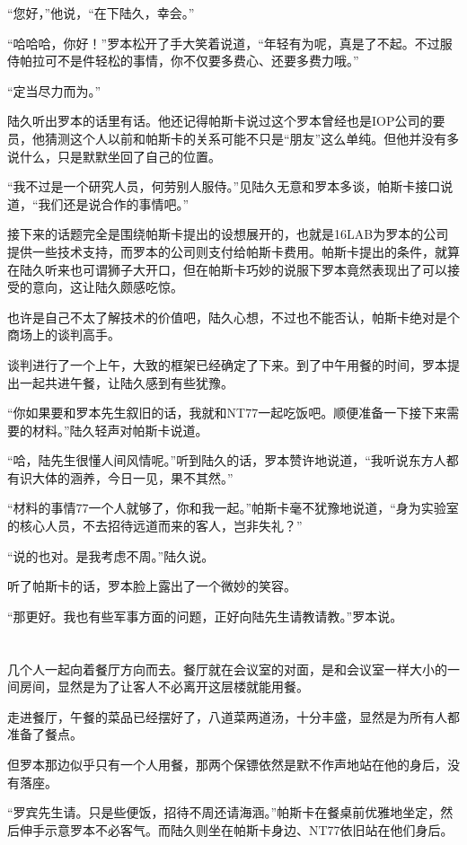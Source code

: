 “您好，”他说，“在下陆久，幸会。”

“哈哈哈，你好！”罗本松开了手大笑着说道，“年轻有为呢，真是了不起。不过服侍帕拉可不是件轻松的事情，你不仅要多费心、还要多费力哦。”

“定当尽力而为。”

陆久听出罗本的话里有话。他还记得帕斯卡说过这个罗本曾经也是IOP公司的要员，他猜测这个人以前和帕斯卡的关系可能不只是“朋友”这么单纯。但他并没有多说什么，只是默默坐回了自己的位置。

“我不过是一个研究人员，何劳别人服侍。”见陆久无意和罗本多谈，帕斯卡接口说道，“我们还是说合作的事情吧。”

接下来的话题完全是围绕帕斯卡提出的设想展开的，也就是16LAB为罗本的公司提供一些技术支持，而罗本的公司则支付给帕斯卡费用。帕斯卡提出的条件，就算在陆久听来也可谓狮子大开口，但在帕斯卡巧妙的说服下罗本竟然表现出了可以接受的意向，这让陆久颇感吃惊。

也许是自己不太了解技术的价值吧，陆久心想，不过也不能否认，帕斯卡绝对是个商场上的谈判高手。

谈判进行了一个上午，大致的框架已经确定了下来。到了中午用餐的时间，罗本提出一起共进午餐，让陆久感到有些犹豫。

“你如果要和罗本先生叙旧的话，我就和NT77一起吃饭吧。顺便准备一下接下来需要的材料。”陆久轻声对帕斯卡说道。

“哈，陆先生很懂人间风情呢。”听到陆久的话，罗本赞许地说道，“我听说东方人都有识大体的涵养，今日一见，果不其然。”

“材料的事情77一个人就够了，你和我一起。”帕斯卡毫不犹豫地说道，“身为实验室的核心人员，不去招待远道而来的客人，岂非失礼？”

“说的也对。是我考虑不周。”陆久说。

听了帕斯卡的话，罗本脸上露出了一个微妙的笑容。

“那更好。我也有些军事方面的问题，正好向陆先生请教请教。”罗本说。\section*{}

几个人一起向着餐厅方向而去。餐厅就在会议室的对面，是和会议室一样大小的一间房间，显然是为了让客人不必离开这层楼就能用餐。

走进餐厅，午餐的菜品已经摆好了，八道菜两道汤，十分丰盛，显然是为所有人都准备了餐点。

但罗本那边似乎只有一个人用餐，那两个保镖依然是默不作声地站在他的身后，没有落座。

“罗宾先生请。只是些便饭，招待不周还请海涵。”帕斯卡在餐桌前优雅地坐定，然后伸手示意罗本不必客气。而陆久则坐在帕斯卡身边、NT77依旧站在他们身后。

